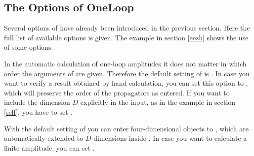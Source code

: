 \enom


\subsection{The Options of OneLoop}
\label{oneopt}
Several options of  have already been introduced in the previous
section.
Here the full list of available options is given. 
The example in section \ref{eezh} shows the use of some options.

In the automatic calculation of one-loop amplitudes it does not matter in which order the 
arguments of  are given. Therefore the default setting of 
is . In case you want to verify a result obtained by hand calculation, you can set this 
option to , which will preserve the order of the propagators as entered.
If you want to include the dimension $D$ explicitly in the input, as in the example
in section \ref{self}, you have to set .

With the default setting of  you can enter four-dimensional objects to 
, which are automatically extended to $D$ dimensions inside .
In case you want to calculate a finite amplitude, you can set .


